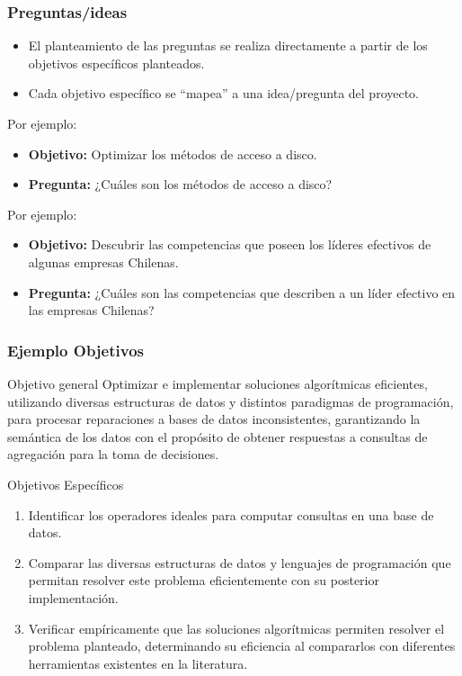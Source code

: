 \documentclass[aspectratio=169]{beamer}%
\newcommand\naranjo[1]{\textcolor[RGB]{251,79,20}{#1}}
\begin{document}
\begin{frame}[fragile]
\frametitle{\textbf{Preguntas/ideas}}
\justifying
\begin{itemize}
 \item El planteamiento de las preguntas se realiza directamente a partir de los objetivos específicos planteados.
\item Cada objetivo específico se ``mapea'' a una idea/pregunta del proyecto.
\end{itemize}


\begin{exampleblock}{Por ejemplo:}
  \begin{itemize}
  \item \textbf{\naranjo{Objetivo:}} Optimizar los métodos de acceso a disco.
  \item \textbf{\naranjo{Pregunta:}} ¿Cuáles son los métodos de acceso a disco?
\end{itemize}
\end{exampleblock}

\begin{exampleblock}{Por ejemplo:}
  \begin{itemize}
  \item \textbf{\naranjo{Objetivo:}} Descubrir las competencias que poseen los líderes efectivos de algunas empresas Chilenas.
  \item \textbf{\naranjo{Pregunta:}} ¿Cuáles son las competencias que describen a un líder efectivo en las empresas Chilenas?
\end{itemize}
\end{exampleblock}
\end{frame}

\begin{frame}[fragile]
\frametitle{\textbf{Ejemplo Objetivos}}
\justifying
\begin{block}{Objetivo general}\justifying
 Optimizar e implementar soluciones algorítmicas eficientes, utilizando diversas estructuras de datos y distintos paradigmas de programación, para procesar reparaciones a bases de datos inconsistentes, garantizando la semántica de los datos con el propósito de obtener respuestas a consultas de agregación para la toma de decisiones.
\end{block}

\begin{block}{Objetivos Específicos}\justifying
 \begin{enumerate}\justifying
 \item Identificar los operadores ideales para computar consultas en una base de datos.
\item Comparar las diversas estructuras de datos y lenguajes de programación que permitan resolver este problema eficientemente con su posterior implementación.
\item Verificar empíricamente que las soluciones algorítmicas permiten resolver el problema planteado, determinando su eficiencia al compararlos con diferentes herramientas existentes en la literatura.
\end{enumerate}
\end{block}
\end{frame}
\end{document}
